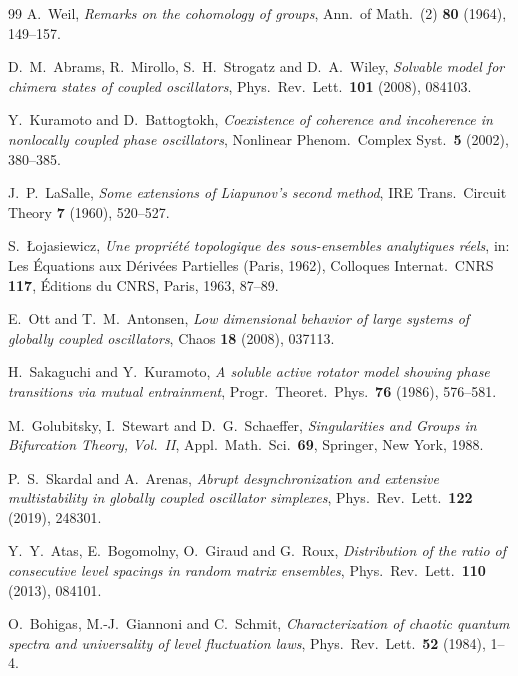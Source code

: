 \begin{thebibliography}{99}
 A.~Weil, \emph{Remarks on the cohomology of groups}, Ann.\ of Math.\ (2) \textbf{80} (1964), 149--157. 

 D.~M.~Abrams, R.~Mirollo, S.~H.~Strogatz and D.~A.~Wiley, \emph{Solvable model for chimera states of coupled oscillators}, Phys.\ Rev.\ Lett.\ \textbf{101} (2008), 084103. 

 Y.~Kuramoto and D.~Battogtokh, \emph{Coexistence of coherence and incoherence in nonlocally coupled phase oscillators}, Nonlinear Phenom.\ Complex Syst.\ \textbf{5} (2002), 380--385.

 J.~P.~LaSalle, \emph{Some extensions of Liapunov's second method}, IRE Trans.\ Circuit Theory \textbf{7} (1960), 520--527. 

 S.~\L{}ojasiewicz, \emph{Une propri\'et\'e topologique des sous-ensembles analytiques r\'eels}, in: Les \'Equations aux D\'eriv\'ees Partielles (Paris, 1962), Colloques Internat.\ CNRS \textbf{117}, \'Editions du CNRS, Paris, 1963, 87--89.

 E.~Ott and T.~M.~Antonsen, \emph{Low dimensional behavior of large systems of globally coupled oscillators}, Chaos \textbf{18} (2008), 037113. 

 H.~Sakaguchi and Y.~Kuramoto, \emph{A soluble active rotator model showing phase transitions via mutual entrainment}, Progr.\ Theoret.\ Phys.\ \textbf{76} (1986), 576--581. 

 M.~Golubitsky, I.~Stewart and D.~G.~Schaeffer, \emph{Singularities and Groups in Bifurcation Theory, Vol.~II}, Appl.\ Math.\ Sci.\ \textbf{69}, Springer, New York, 1988. 

 P.~S.~Skardal and A.~Arenas, \emph{Abrupt desynchronization and extensive multistability in globally coupled oscillator simplexes}, Phys.\ Rev.\ Lett.\ \textbf{122} (2019), 248301. 

 Y.~Y.~Atas, E.~Bogomolny, O.~Giraud and G.~Roux, \emph{Distribution of the ratio of consecutive level spacings in random matrix ensembles}, Phys.\ Rev.\ Lett.\ \textbf{110} (2013), 084101. 

 O.~Bohigas, M.-J.~Giannoni and C.~Schmit, \emph{Characterization of chaotic quantum spectra and universality of level fluctuation laws}, Phys.\ Rev.\ Lett.\ \textbf{52} (1984), 1--4. 


\end{thebibliography}
